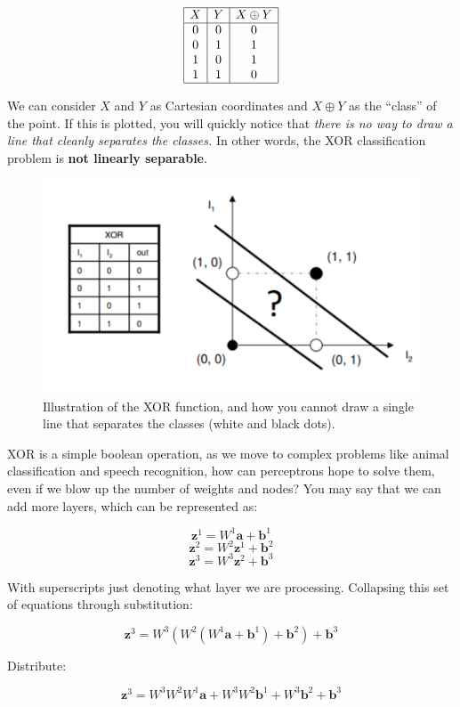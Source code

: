 \begin{flushleft}
    $$\begin{array}{|c|c|c|}
    \hline
    X & Y & X \oplus Y \\
    \hline
    0 & 0 & 0 \\
    0 & 1 & 1 \\
    1 & 0 & 1 \\
    1 & 1 & 0 \\
    \hline
    \end{array}$$

    We can consider $X$ and $Y$ as Cartesian coordinates and $X \oplus Y$ as the ``class'' of the point. If this is plotted, you will quickly notice that \textit{there is no way to draw a line that cleanly separates the classes.} In other words, the XOR classification problem is \textbf{not linearly separable}.

    \begin{figure}[H]
        \centering
        \includegraphics[width=0.5\linewidth]{dl/xor.png}
        \caption{Illustration of the XOR function, and how you cannot draw a single line that separates the classes (white and black dots).}
        \label{fig:xor}
    \end{figure}
    
    XOR is a simple boolean operation, as we move to complex problems like animal classification and speech recognition, how can perceptrons hope to solve them, even if we blow up the number of weights and nodes? You may say that we can add more layers, which can be represented as:

    $$\textbf{z}^1 = W^1\textbf{a} + \textbf{b}^1$$
    $$\textbf{z}^2 = W^2\textbf{z}^1 + \textbf{b}^2$$
    $$\textbf{z}^3 = W^3\textbf{z}^2 + \textbf{b}^3$$

    With superscripts just denoting what layer we are processing. Collapsing this set of equations through substitution:

    $$\textbf{z}^3 = W^3(W^2(W^1\textbf{a} + \textbf{b}^1) + \textbf{b}^2) + \textbf{b}^3$$

    Distribute:

    $$\textbf{z}^3 = W^3W^2W^1\textbf{a} + W^3W^2\textbf{b}^1 + W^3\textbf{b}^2 + \textbf{b}^3$$


\end{flushleft}
